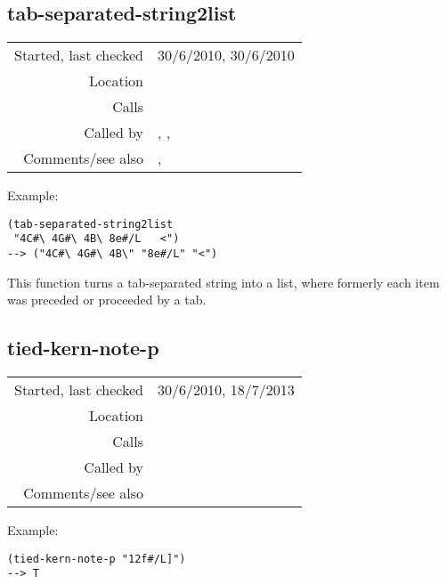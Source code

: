 \subsection*{tab-separated-string2list}\label{fun:tab-separated-string2list}

\vspace{0.3cm}
\begin{tabular}{r|p{8cm}}
Started, last checked & 30/6/2010, 30/6/2010 \\
Location & \nameref{sec:kern} \\
Calls & \nameref{fun:tab-positions} \\
Called by & \nameref{fun:parse-kern-row}, \nameref{fun:staves-info2staves-variable},\newline \nameref{fun:update-staves-variable} \\
Comments/see also & \nameref{fun:comma-separated-string2list},\newline \nameref{fun:space-bar-separated-string2list}
\end{tabular}

\vspace{0.5cm}
\noindent Example:
\begin{Verbatim}[showtabs=true]
(tab-separated-string2list
 "4C#\ 4G#\ 4B\	8e#/L	<")
--> ("4C#\ 4G#\ 4B\" "8e#/L" "<")
\end{Verbatim}

\noindent This function turns a tab-separated string
into a list, where formerly each item was preceded or
proceeded by a tab.


\subsection*{tied-kern-note-p}\label{fun:tied-kern-note-p}

\vspace{0.3cm}
\begin{tabular}{r|p{8cm}}
Started, last checked & 30/6/2010, 18/7/2013 \\
Location & \nameref{sec:kern} \\
Calls & \\
Called by & \\
Comments/see also &
\end{tabular}

\vspace{0.5cm}
\noindent Example:
\begin{verbatim}
(tied-kern-note-p "12f#/L]")
--> T
\end{verbatim}

